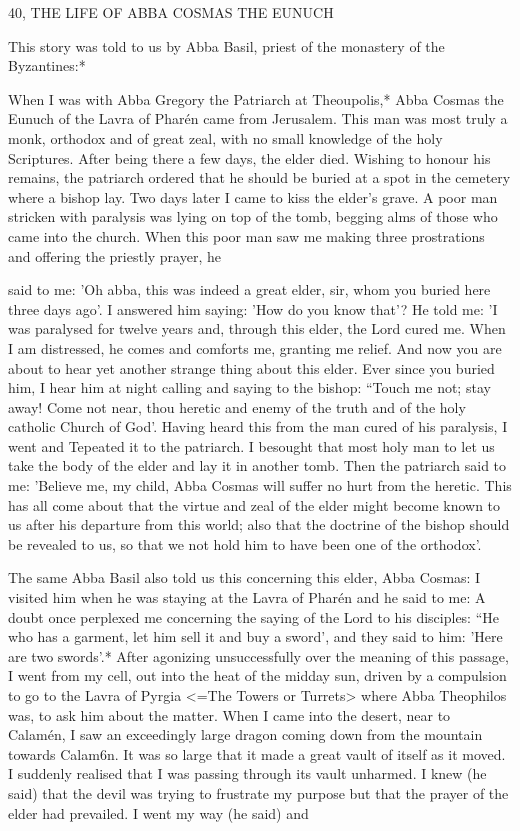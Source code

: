 40, THE LIFE OF ABBA COSMAS THE EUNUCH

This story was told to us by Abba Basil, priest of the monastery of
the Byzantines:*

When I was with Abba Gregory the Patriarch at Theoupolis,* Abba
Cosmas the Eunuch of the Lavra of Pharén came from Jerusalem.
This man was most truly a monk, orthodox and of great zeal, with
no small knowledge of the holy Scriptures. After being there a few
days, the elder died. Wishing to honour his remains, the patriarch
ordered that he should be buried at a spot in the cemetery where a
bishop lay. Two days later I came to kiss the elder's grave. A poor
man stricken with paralysis was lying on top of the tomb, begging
alms of those who came into the church. When this poor man saw
me making three prostrations and offering the priestly prayer, he

said to me: 'Oh abba, this was indeed a great elder, sir, whom you
buried here three days ago'. I answered him saying: 'How do you
know that'? He told me: 'I was paralysed for twelve years and,
through this elder, the Lord cured me. When I am distressed, he
comes and comforts me, granting me relief. And now you are about
to hear yet another strange thing about this elder. Ever since you
buried him, I hear him at night calling and saying to the bishop:
“Touch me not; stay away! Come not near, thou heretic and enemy
of the truth and of the holy catholic Church of God'. Having
heard this from the man cured of his paralysis, I went and Tepeated
it to the patriarch. I besought that most holy man to let us take the
body of the elder and lay it in another tomb. Then the patriarch
said to me: 'Believe me, my child, Abba Cosmas will suffer no hurt
from the heretic. This has all come about that the virtue and zeal of
the elder might become known to us after his departure from this
world; also that the doctrine of the bishop should be revealed to us,
so that we not hold him to have been one of the orthodox'.

The same Abba Basil also told us this concerning this elder,
Abba Cosmas:
I visited him when he was staying at the Lavra of Pharén and he
said to me: A doubt once perplexed me concerning the saying of the
Lord to his disciples: “He who has a garment, let him sell it and buy
a sword', and they said to him: 'Here are two swords'.* After
agonizing unsuccessfully over the meaning of this passage, I went
from my cell, out into the heat of the midday sun, driven by a
compulsion to go to the Lavra of Pyrgia <=The Towers or Turrets>
where Abba Theophilos was, to ask him about the matter. When I
came into the desert, near to Calamén, I saw an exceedingly large
dragon coming down from the mountain towards Calam6n. It was
so large that it made a great vault of itself as it moved. I suddenly
realised that I was passing through its vault unharmed. I knew (he
said) that the devil was trying to frustrate my purpose but that the
prayer of the elder had prevailed. I went my way (he said) and

